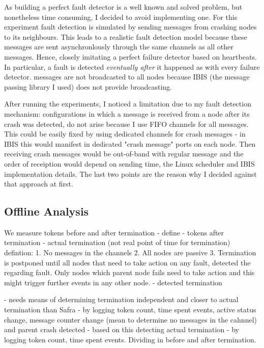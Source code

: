 As building a perfect fault detector is a well known and solved problem, but nonetheless time consuming, I decided to avoid implementing one.
For this experiment fault detection is simulated by sending  messages from crashing nodes to its neighbours. 
This leads to a realistic fault detection model because these messages are sent asynchronlously through the same channels as all other messages. 
Hence, closely imitating a perfect failure detector based on heartbeats. 
In particular, a fault is detected \textit{eventually after} it happened as with every failure detector.
 messages are not broadcasted to all nodes because IBIS (the message passing library I used) does not provide broadcasting.

After running the experiments, I noticed a limitation due to my fault detection mechanism:
configurations in which a message is received from a node after its crash was detected, do not arise because I use FIFO channels for all messages.  %
This could be easily fixed by using dedicated channels for crash messages - in IBIS this would manifest in dedicated "crash message" ports on each node.
Then receiving crash messages would be out-of-band with regular message and the order of receiption would depend on sending time, the Linux scheduler and IBIS implementation details.
The last two points are the reason why I decided against that approach at first.

  

\subsection{Offline Analysis}
We measure tokens before and after termination
  - define 
    - tokens after termination
    - actual termination (not real point of time for termination)
      defintion:
       1. No messages in the channels
        2. All nodes are passive
        3. Termination is postponed until all nodes that need to take action on any fault, detected the regarding fault. Only nodes which parent node fails need to take action and this might trigger further events in any other node.
    - detected termination
    
  - needs means of determining termination independent and closer to actual termination than Safra
    - by logging token count, time spent events, active status change, message counter change (mean to determine no messages in the cahnnel) and parent crash detected
    - based on this detecting actual termination
    - by logging token count, time spent events. Dividing in before and after termination.
    

